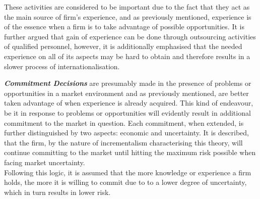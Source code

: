 \documentclass[11pt,a4paper]{article}
\begin{document}
These activities are considered to be important due to the fact that they act as the main source of firm's experience, and as previously mentioned, experience is of the essence when a firm is to take advantage of possible opportunities. It is further argued that gain of experience can be done through outsourcing activities of qualified personnel, however, it is additionally emphasised that the needed experience on all of its aspects may be hard to obtain and therefore results in a slower process of internationalisation. \par
\textbf{\textit{Commitment Decisions}} are presumably made in the presence of problems or opportunities in a market environment and as previously mentioned, are better taken advantage of when experience is already acquired. This kind of endeavour, be it in response to problems or opportunities will evidently result in additional commitment to the market in question. Each commitment, when extended, is further distinguished by two aspects: economic and uncertainty. It is described, that the firm, by the nature of incrementalism characterising this theory, will continue committing to the market until hitting the maximum risk possible when facing market uncertainty. \\
Following this logic, it is assumed that the more knowledge or experience a firm holds, the more it is willing to commit due to to a lower degree of uncertainty, which in turn results in lower risk. \par
\end{document}
